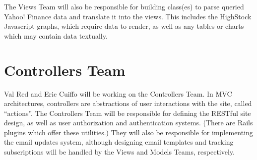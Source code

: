 \documentclass[11pt,letterpaper,oneside]{memoir}
\begin{document}
The Views Team will also be responsible for building class(es) to parse queried Yahoo! Finance
data and translate it into the views. This includes the HighStock Javascript graphs, which
require data to render, as well as any tables or charts which may contain data textually. 

\section{Controllers Team}

Val Red and Eric Cuiffo will be working on the Controllers Team. In MVC architectures,
controllers are abstractions of user interactions with the site, called ``actions''. The 
Controllers Team will be responsible for defining the RESTful site design, as well as user
authorization and authentication systems. (There are Rails plugins which offer these 
utilities.)
They will also be responsible for implementing the
email updates system, although designing email templates and tracking subscriptions will be
handled by the Views and Models Teams, respectively.
\end{document}
